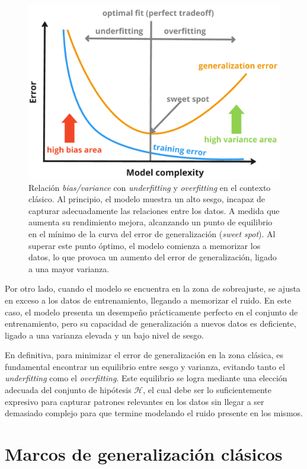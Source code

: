 \begin{figure}[h]
    \centering
    \includegraphics[width=0.6\linewidth]{img/biasvarianceunderoverfitting.png}
    \caption[Relación \textit{bias/variance} con \textit{underfitting} y \textit{overfitting} en el contexto clásico.] {Relación \textit{bias/variance} con \textit{underfitting} y \textit{overfitting} en el contexto clásico. Al principio, el modelo muestra un alto sesgo, incapaz de capturar adecuadamente las relaciones entre los datos. A medida que aumenta su rendimiento mejora, alcanzando un punto de equilibrio en el mínimo de la curva del error de generalización (\textit{sweet spot}). Al superar este punto óptimo, el modelo comienza a memorizar los datos, lo que provoca un aumento del error de generalización, ligado a una mayor varianza.}\label{fig:biasvarianceunderoverfitting}
\end{figure}

Por otro lado, cuando el modelo se encuentra en la zona de sobreajuste, se ajusta en exceso a los datos de entrenamiento, llegando a memorizar el ruido. En este caso, el modelo presenta un desempeño prácticamente perfecto en el conjunto de entrenamiento, pero su capacidad de generalización a nuevos datos es deficiente, ligado a una varianza elevada y un bajo nivel de sesgo.

En definitiva, para minimizar el error de generalización en la zona clásica, es fundamental encontrar un equilibrio entre sesgo y varianza, evitando tanto el \emph{underfitting} como el \emph{overfitting}. Este equilibrio se logra mediante una elección adecuada del conjunto de hipótesis $\mathcal{H}$, el cual debe ser lo suficientemente expresivo para capturar patrones relevantes en los datos sin llegar a ser demasiado complejo para que termine modelando el ruido presente en los mismos.

\section{Marcos de generalización clásicos}\label{sec:marcos-generalizacion-clasicos}

